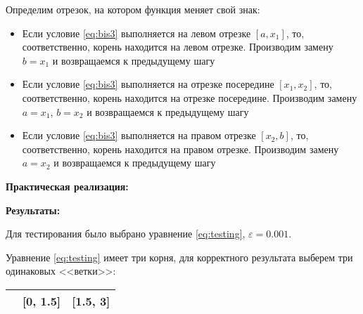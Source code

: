 \documentclass[a4paper, 12pt]{article}   	%
\begin{document}
 Определим отрезок, на котором функция меняет свой знак:
\begin{itemize}
 \item Если условие \eqref{eq:bis3} выполняется на левом отрезке $[a, x_1]$, то, соответственно, корень находится на левом отрезке. Производим замену $b = x_1$ и возвращаемся к предыдущему шагу
 \item Если условие \eqref{eq:bis3} выполняется на отрезке посередине $[x_1, x_2]$, то, соответственно, корень находится на отрезке посередине. Производим замену $a = x_1$, $b = x_2$ и возвращаемся к предыдущему шагу 
 \item Если условие \eqref{eq:bis3} выполняется на правом отрезке $[x_2, b]$, то, соответственно, корень находится на правом отрезке. Производим замену $a = x_2$ и возвращаемся к предыдущему шагу
 \end{itemize}

\textbf{Практическая реализация:}
\hypertarget{lst:quad}{}



\textbf{Результаты:}

Для тестирования было выбрано уравнение \eqref{eq:testing}, $\varepsilon = 0.001$.

Уравнение \eqref{eq:testing} имеет три корня, для корректного результата выберем три одинаковых <<ветки>>:
\begin{table}[h]
\begin{center}
\begin{tabular}{|P{4cm}|P{2.5cm}|P{4cm}|}
\hline
[-1.5, 0] & [0, 1.5] & [1.5, 3] \\
\hline
\end{tabular}
\end{center}
\end{table}
\end{document}
